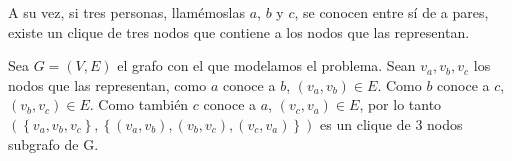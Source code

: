 \documentclass[a4paper, 12pt]{article}
\begin{document}
A su vez, si tres personas, llam\'emoslas $a$, $b$ y $c$, se conocen entre s\'i de a pares, existe un clique de tres nodos que contiene a los nodos que las representan. 


Sea $ G = \left( V, E \right) $ el grafo con el que modelamos el problema. Sean $v_a, v_b, v_c$ los nodos que las representan, como $a$ conoce a $b$, $\left( v_a,v_b \right) \in E $. Como $b$ conoce a $c$, $ \left(v_b, v_c \right) \in E$. Como tambi\'en $c$ conoce a $a$, $ \left( v_c, v_a \right) \in E$, por lo tanto $\left( \left\lbrace v_a, v_b, v_c \right\rbrace, \left\lbrace  \left(v_a,v_b\right) , \left( v_b,v_c\right), \left( v_c, v_a\right) \right\rbrace\right)$ es un clique de 3 nodos subgrafo de G.
\end{document}
